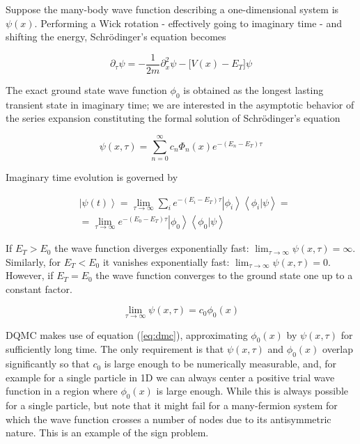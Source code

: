 \documentclass[10pt, twocolumn, twoside]{article}
\begin{document}
Suppose the many-body wave function describing a one-dimensional system is $\psi (x)$. Performing a Wick rotation - effectively going to imaginary time - and shifting the energy, Schr\"odinger's equation becomes

\begin{equation}
\partial_\tau \psi = -\frac{1}{2m} \partial^2_x \psi - \bigg[ V(x) - E_T \bigg] \psi
\end{equation}

The exact ground state wave function $\phi_0$ is obtained as the longest lasting transient state in imaginary time; we are interested in the asymptotic behavior of the series expansion constituting the formal solution of Schr\"odinger's equation

\begin{equation}
\psi (x, \tau) = \sum_{n=0}^{\infty} c_n \Phi_n (x) e^{-(E_n - E_T)\tau}
\end{equation}

Imaginary time evolution is governed by

\begin{equation}\label{eq:im_ev}
\begin{split}
&\left| \psi (t) \right\rangle = \lim_{\tau \rightarrow \infty} \sum_i e^{-(E_i - E_T) \tau} \left| \phi_i \right\rangle \left\langle\phi_i | \psi \right\rangle = \\
&= \lim_{\tau \rightarrow \infty} e^{-(E_0 - E_T)\tau} \left| \phi_0 \right\rangle \left\langle \phi_0 | \psi \right\rangle
\end{split}
\end{equation}


If $E_T > E_0$ the wave function diverges exponentially fast: $\lim_{\tau \rightarrow \infty} \psi ( x, \tau) = \infty$. Similarly, for $E_T < E_0$ it vanishes exponentially fast: $
\lim_{\tau \rightarrow \infty} \psi ( x, \tau) = 0$. However, if $E_T = E_0$ the wave function converges to the ground state one up to a constant factor.

\begin{equation}\label{eq:dmc}
\lim_{\tau \rightarrow \infty} \psi ( x, \tau) = c_0 \phi_0 (x)
\end{equation}

DQMC makes use of equation (\ref{eq:dmc}), approximating $\phi_0(x)$ by $\psi (x, \tau)$ for sufficiently long time. The only requirement is that $\psi (x, \tau)$ and $\phi_0(x)$ overlap significantly so that $c_0$ is large enough to be numerically measurable, and, for example for a single particle in 1D we can always center a positive trial wave function in a region where $\phi_0(x)$ is large enough. While this is always possible for a single particle, but note that it might fail for a many-fermion system for which the wave function crosses a number of nodes due to its antisymmetric nature. This is an example of the sign problem.\par
\end{document}
